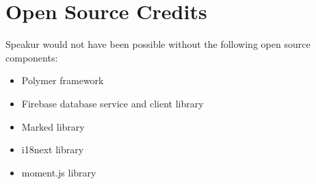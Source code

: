 \chapter{Open Source Credits}
%

Speakur would not have been possible without the following open source components:

\begin{itemize}
\item Polymer framework~\cite{polymercontributors2015}
\item Firebase database service and client library~\cite{firebasecontributors2015}
\item Marked library
\item i18next library
\item moment.js library
\end{itemize}
